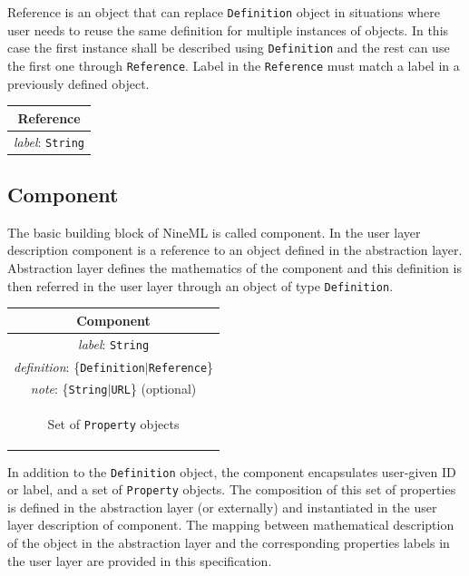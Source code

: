 \documentclass{article}
\begin{document}
Reference is an object that can replace {\tt Definition} object in situations
where user needs to reuse the same definition for multiple instances of
objects. In this case the first instance shall be described using
{\tt Definition} and the rest can use the first one through {\tt Reference}.
Label in the {\tt Reference} must match a label in a previously defined
object.

\begin{table}[htb]
\center
\begin{tabular}{|c|}
\hline
\hline
Reference \\
\hline
\hline
{\em label}: {\tt String} \\
\hline
\end{tabular}
\end{table}

\subsection{Component}

The basic building block of NineML is called component. In the user layer
description component is a reference to an object defined in the abstraction
layer. Abstraction layer defines the mathematics of the component and this
definition is then referred in the user layer through an object of type
{\tt Definition}.

\begin{table}[htb]
\center
\begin{tabular}{|c|}
\hline
\hline
Component \\
\hline
\hline
{\em label}: {\tt String} \\
\hline
{\em definition}: \{{\tt Definition}$|${\tt Reference}\}\\
\hline
{\em note}: \{{\tt String}$|${\tt URL}\} (optional)\\
\hline
\colorbox{issuecolor}{\parbox{0.4\linewidth}
{\center Set of {\tt Property} objects}} \\
\hline
\end{tabular}
\end{table}

In addition to the {\tt Definition} object, the component encapsulates
user-given ID or label, and a set of {\tt Property} objects. The composition
of this set of properties is defined in the abstraction layer (or externally)
and instantiated in the user layer description of component. The mapping
between mathematical description of the object in the abstraction
layer and the corresponding properties labels in the user layer are
provided in this specification.
\end{document}
